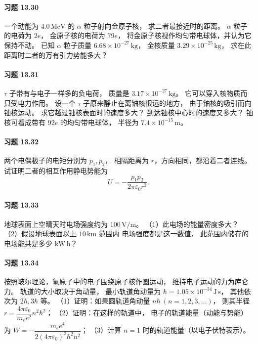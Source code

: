 \paragraph{习题 13.30}
一个动能为 \(4.0\,\mathrm{MeV}\) 的 \(\alpha\) 粒子射向金原子核，
求二者最接近时的距离。 \(\alpha\) 粒子的电荷为 \(2e\)，
金原子核的电荷为 \(79e\)，
将金原子核视作均匀带电球体，并认为它保持不动。
已知 \(\alpha\) 粒子质量 \(6.68\times10^{-27}\,\mathrm{kg}\)，
金核质量 \(3.29\times10^{-25}\,\mathrm{kg}\)，
求在此距离时二者的万有引力势能多大？

\paragraph{习题 13.31}
\(\tau\) 子带有与电子一样多的负电荷，
质量是 \(3.17\times10^{-27}\,\mathrm{kg}\)。
它可以穿入核物质而只受电力作用。
设一个 \(\tau\) 子原来静止在离铀核很远的地方，
由于铀核的吸引而向铀核运动。
求它越过铀核表面时的速度多大？
到达铀核中心时的速度又多大？
铀核可看成带有 \(92e\) 的均匀带电球体，
半径为 \(7.4\times10^{-15}\,\mathrm m\)。

\paragraph{习题 13.32}
两个电偶极子的电矩分别为 \(p_1,p_2\)，
相隔距离为 \(r\)，方向相同，都沿着二者连线。
试证明二者的相互作用静电势能为
\[
 U=-\frac{p_1p_2}{2\pi\varepsilon_0r^3}.
\]

\paragraph{习题 13.33}
地球表面上空晴天时电场强度约为 \(100\,\mathrm{V/m}\)。
（1）此电场的能量密度多大？
（2）假设地球表面以上 \(10\,\mathrm{km}\) 范围内
电场强度都是这一数值，
此范围内储存的电场能共是多少 \(\mathrm{kW\,h}\)？

\paragraph{习题 13.34}
按照玻尔理论，氢原子中的电子围绕原子核作圆运动，
维持电子运动的力为库仑力。
轨道的大小取决于角动量，
最小轨道角动量为
\(\hbar=1.05\times10^{-34}\,\mathrm{J\,s}\)，
其他依次为 \(2\hbar,3\hbar\) 等。
（1）证明：如果圆轨道角动量
\(n\hbar\ (n=1,2,3,\ldots)\)，
则其半径
\(r=\dfrac{4\pi\varepsilon_0}{m_ee^2}n^2\hbar^2\)；
（2）证明：在这样的轨道中，
电子的轨道能量（动能与势能）为
\(W=-\dfrac{m_ee^4}{2(4\pi\varepsilon_0)^2\hbar^2n^2}\)；
（3）计算 \(n=1\) 时的轨道能量（以电子伏特表示）。
